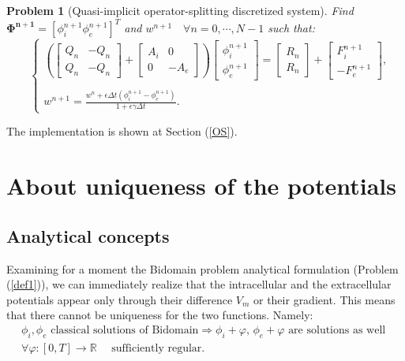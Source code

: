 \documentclass[a4paper,11pt]{article}
\newtheorem{problem}{Problem}
\begin{document}
\begin{problem} [Quasi-implicit operator-splitting discretized system]
Find $\bm{\Phi^{n+1}}=[\phi_i^{n+1} \phi_e^{n+1}]^T$ and $w^{n+1} \quad \forall n=0, \cdots, N-1$ such that:
\begin{equation*}
\quad
\begin{cases}
\left(
\begin{bmatrix} Q_n & -Q_n \\ Q_n & -Q_n \end{bmatrix} + 
\begin{bmatrix} A_i & 0 \\ 0 & -A_e\end{bmatrix}
\right)
\begin{bmatrix}
\phi_i^{n+1} \\ \phi_e^{n+1}
\end{bmatrix}
= \begin{bmatrix} R_n \\ R_n \end{bmatrix} + \begin{bmatrix} F_i^{n+1} \\  -F_e^{n+1}\end{bmatrix},\\ \\
w^{n+1} = \frac{\displaystyle w^n + \epsilon \Delta t (\phi_i^{n+1}-\phi_e^{n+1})}{\displaystyle 1+\epsilon \gamma \Delta t}.
\end{cases}
\end{equation*}
\end{problem}
\vspace{4mm}
\noindent The implementation is shown at Section (\ref{OS}).
\newpage
\section{About uniqueness of the potentials}\label{unique}
\subsection{Analytical concepts}
\noindent Examining for a moment the Bidomain problem analytical formulation (Problem (\ref{def1})), we can immediately realize that the intracellular and the extracellular potentials appear only through their difference $V_m$ or their gradient. This means that there cannot be uniqueness for the two functions. Namely: \vspace{2mm}
\begin{equation}\label{phi_uniqueness}
\begin{gathered}
\phi_i,\phi_e \text{ classical solutions of Bidomain} \Rightarrow \phi_i+\varphi,\,\phi_e+\varphi \text{ are solutions as well } \\
 \forall \varphi: [0,T] \rightarrow \mathbb{R} \quad \text{ sufficiently regular}.
\end{gathered}
\end{equation}
\end{document}
